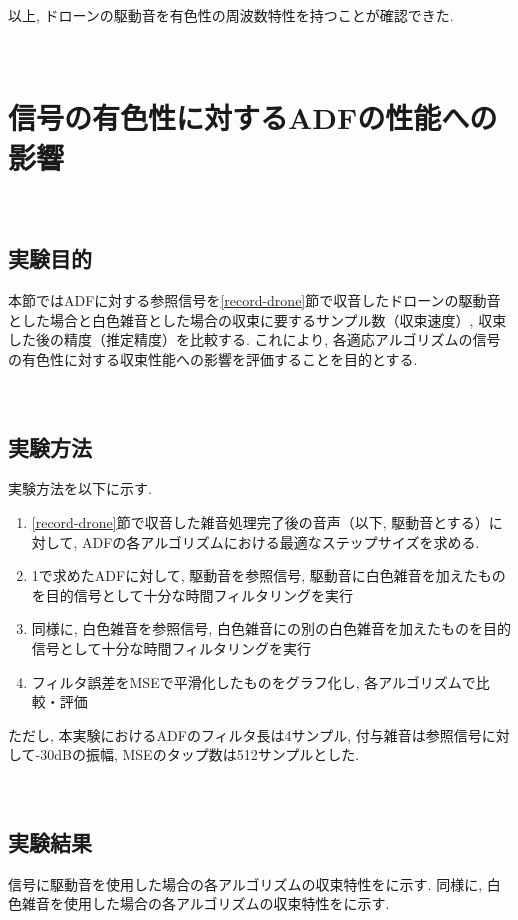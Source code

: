 以上, ドローンの駆動音を有色性の周波数特性を持つことが確認できた. 

\
\section{信号の有色性に対するADFの性能への影響}\label{adf-color-effect}

\
\subsection{実験目的}\label{purpose-color}

本節ではADFに対する参照信号を\ref{record-drone}節で収音したドローンの駆動音とした場合と白色雑音とした場合の収束に要するサンプル数（収束速度）, 収束した後の精度（推定精度）を比較する. 
これにより, 各適応アルゴリズムの信号の有色性に対する収束性能への影響を評価することを目的とする. 

\
\subsection{実験方法}\label{instruction-color}

実験方法を以下に示す. 

\begin{enumerate}
\renewcommand{\labelenumi}{(\arabic{enumi})}
\tightlist
\item
  \ref{record-drone}節で収音した雑音処理完了後の音声（以下, 駆動音とする）に対して, ADFの各アルゴリズムにおける最適なステップサイズを求める. 
\item
  1で求めたADFに対して, 駆動音を参照信号, 駆動音に白色雑音を加えたものを目的信号として十分な時間フィルタリングを実行
\item
  同様に, 白色雑音を参照信号, 白色雑音にの別の白色雑音を加えたものを目的信号として十分な時間フィルタリングを実行
\item
  フィルタ誤差をMSEで平滑化したものをグラフ化し, 各アルゴリズムで比較・評価
\end{enumerate}

ただし, 本実験におけるADFのフィルタ長は4サンプル, 付与雑音は参照信号に対して-30dBの振幅, MSEのタップ数は512サンプルとした. 

\
\subsection{実験結果}\label{result-color}

信号に駆動音を使用した場合の各アルゴリズムの収束特性をに示す. 同様に, 白色雑音を使用した場合の各アルゴリズムの収束特性をに示す. 

